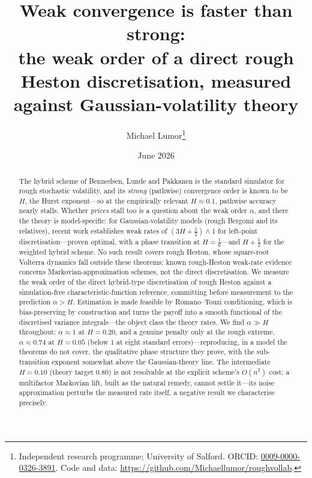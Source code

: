 \documentclass[11pt]{article}
\title{Weak convergence is faster than strong:\\
the weak order of a direct rough Heston discretisation,
measured against Gaussian-volatility theory}
\author{Michael Lumor\thanks{Independent research programme; University of
Salford. ORCID: \href{https://orcid.org/0009-0000-0326-3891}{0009-0000-0326-3891}.
Code and data: \url{https://github.com/Michaellumor/roughvollab}.}}
\date{June 2026}
\theoremstyle{plain}
\theoremstyle{definition}
\begin{document}
\maketitle

\begin{abstract}
The hybrid scheme of Bennedsen, Lunde and Pakkanen is the standard simulator for
rough stochastic volatility, and its \emph{strong} (pathwise) convergence order is
known to be $H$, the Hurst exponent---so at the empirically relevant $H\approx 0.1$,
pathwise accuracy nearly stalls. Whether \emph{prices} stall too is a question about
the weak order $\alpha$, and there the theory is model-specific: for Gaussian-volatility
models (rough Bergomi and its relatives), recent work establishes weak rates of
$(3H+\tfrac12)\wedge 1$ for left-point discretisation---proven optimal, with a phase
transition at $H=\tfrac16$---and $H+\tfrac12$ for the weighted hybrid scheme. No such
result covers rough Heston, whose square-root Volterra dynamics fall outside these
theorems; known rough-Heston weak-rate evidence concerns Markovian-approximation
schemes, not the direct discretisation. We measure the weak order of the direct
hybrid-type discretisation of rough Heston against a simulation-free
characteristic-function reference, committing before measurement to the prediction
$\alpha>H$. Estimation is made feasible by Romano--Touzi conditioning, which is
bias-preserving by construction and turns the payoff into a smooth functional of the
discretised variance integrals---the object class the theory rates. We find
$\alpha\gg H$ throughout: $\alpha\approx 1$ at $H=0.20$, and a genuine penalty only at
the rough extreme, $\alpha\approx 0.74$ at $H=0.05$ (below $1$ at eight standard
errors)---reproducing, in a model the theorems do not cover, the qualitative phase
structure they prove, with the sub-transition exponent somewhat above the
Gaussian-theory line. The intermediate $H=0.10$ (theory target $0.80$) is not
resolvable at the explicit scheme's $O(n^2)$ cost; a multifactor Markovian lift,
built as the natural remedy, cannot settle it---its noise approximation perturbs the
measured rate itself, a negative result we characterise precisely.
\end{abstract}
\end{document}
